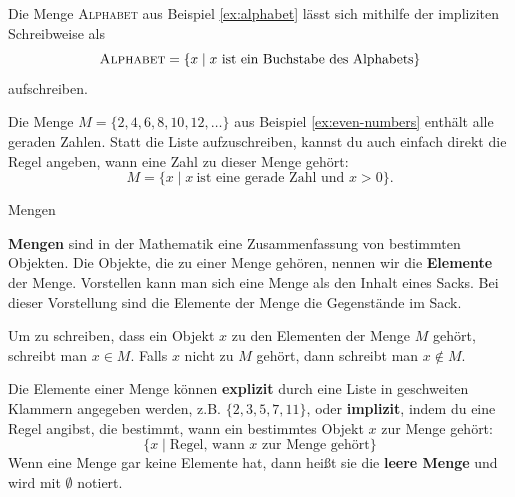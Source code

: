 \documentclass[../../main.tex]{subfiles}
\begin{document}
\begin{example}{}
    Die Menge \textsc{Alphabet} aus Beispiel \ref{ex:alphabet} lässt sich mithilfe der impliziten Schreibweise als
    \[\textsc{Alphabet}=\{x\mid x~\text{ist~ein~Buchstabe~des~Alphabets}\}\]
    aufschreiben.
\end{example}

\begin{example}{}
    Die Menge $M=\{2,4,6,8,10,12,\dots\}$ aus Beispiel \ref{ex:even-numbers} enthält alle geraden Zahlen. Statt die Liste aufzuschreiben, kannst du auch einfach direkt die Regel angeben, wann eine Zahl zu dieser Menge gehört:
    \[M=\{x\mid x~\text{ist~eine~gerade~Zahl~und~}x>0\}.\]
\end{example}

\begin{nutshell}{Mengen}

    \textbf{Mengen} sind in der Mathematik eine Zusammenfassung von bestimmten Objekten. Die Objekte, die zu einer Menge gehören, nennen wir die \textbf{Elemente} der Menge. Vorstellen kann man sich eine Menge als den Inhalt eines Sacks. Bei dieser Vorstellung sind die Elemente der Menge die Gegenstände im Sack.

    Um zu schreiben, dass ein Objekt $x$ zu den Elementen der Menge $M$ gehört, schreibt man $x\in M$. Falls $x$ nicht zu $M$ gehört, dann schreibt man $x\notin M$.

    Die Elemente einer Menge können \textbf{explizit} durch eine Liste in geschweiten Klammern angegeben werden, z.B. $\{2,3,5,7,11\}$,
    oder \textbf{implizit}, indem du eine Regel angibst, die bestimmt, wann ein bestimmtes Objekt $x$ zur Menge gehört:
    \[\{x\mid \text{Regel,~wann~}x\text{~zur~Menge~gehört}\}\]
    Wenn eine Menge gar keine Elemente hat, dann heißt sie die \textbf{leere Menge} und wird mit $\emptyset$ notiert.
\end{nutshell}
\end{document}
